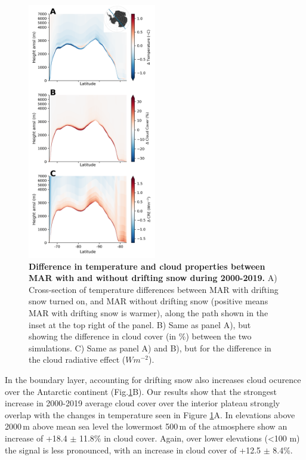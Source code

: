 \documentclass[draft]{agujournal2019}
\begin{document}
\begin{figure}[H]
	\includegraphics[width=0.5\textwidth]{cross_section_lt_new.png}
	\caption{\textbf{Difference in temperature and cloud properties between MAR with and without drifting snow during 2000-2019.} A) Cross-section of temperature differences between MAR with drifting snow turned on, and MAR without drifting snow (positive means MAR with drifting snow is warmer), along the path shown in the inset at the top right of the panel. B) Same as panel A), but showing the difference in cloud cover (in \%) between the two simulations. C) Same as panel A) and B), but for the difference in the cloud radiative effect ($Wm^{-2}$). }
	\label{fig:Test}
\end{figure}

In the boundary layer, accounting for drifting snow also increases cloud ocurence over the Antarctic continent (Fig.\ref{fig:Test}B). Our results show that the strongest increase in 2000-2019 average cloud cover over the interior plateau strongly overlap with the changes in temperature seen in Figure \ref{fig:Test}A. In elevations above 2000\,m above mean sea level the lowermost 500\,m of the atmosphere show an increase of +18.4 $\pm$ 11.8\% in cloud cover. Again, over lower elevations (<100 m) the signal is less pronounced, with an increase in cloud cover of +12.5 $\pm$ 8.4\%.
\end{document}
